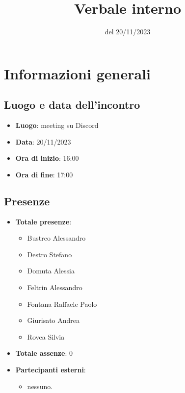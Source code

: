 \documentclass[12pt]{article}
\title{Verbale interno}
\date{del 20/11/2023}
\begin{document}
	\makefirstpage
	
	
	\clearpage
	
	\tableofcontents
	\clearpage

    \section{Informazioni generali}
    
    \subsection{Luogo e data dell'incontro}
    
    \begin{itemize}
    	\item \textbf{Luogo}: meeting su Discord
    	\item \textbf{Data}: 20/11/2023
    	\item \textbf{Ora di inizio}: 16:00
    	\item \textbf{Ora di fine}: 17:00
    \end{itemize}
    
    \subsection{Presenze}
    
    \begin{itemize}
    	\item \textbf{Totale presenze}:
    	\begin{itemize}
    		\item Bustreo Alessandro
    		\item Destro Stefano
    		\item Domuta Alessia 
    		\item Feltrin Alessandro 
    		\item Fontana Raffaele Paolo 
    		\item Giurisato Andrea 
    		\item Rovea Silvia
    	\end{itemize}
    	
    	\item \textbf{Totale assenze}: 0
    	
    	\item \textbf{Partecipanti esterni}:
    	\begin{itemize}
    		\item nessuno.
    	\end{itemize}
    \end{itemize}
    
\end{document}
